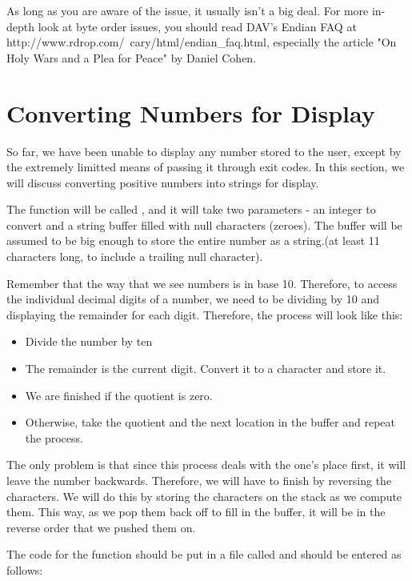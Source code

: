 As long as you are aware of the issue, it usually isn't a big deal.  For more
in-depth look at byte order issues, you should read DAV's Endian FAQ at http://www.rdrop.com/~cary/html/endian\_faq.html, especially the article "On Holy Wars and a Plea for Peace" by Daniel Cohen.

\section{Converting Numbers for Display}

So far, we have been unable to display any number stored to the 
user, except by the extremely limitted means of passing it through
exit codes.  In this section, we will discuss converting positive numbers
into strings for display.

The function will be called , and
it will take two parameters - an integer to convert and a string buffer 
filled with null characters (zeroes).  The buffer will be assumed to
be big enough to store the entire number as a string.(at least 11 characters
long, to include a trailing null character).

Remember that the way that we see numbers is in base 10.  Therefore, to access
the individual decimal digits of a number, we need to be dividing by 10
and displaying the remainder for each digit.  Therefore, the process will
look like this:

\begin{itemize}\item Divide the number by ten 
\item The remainder is the current digit.  Convert it to a character and store it. 
\item We are finished if the quotient is zero. 
\item Otherwise, take the quotient and the next location in the buffer and repeat the process. 
\end{itemize}

The only problem is that since this process deals with the one's place first,
it will leave the number backwards.  Therefore, we will have to finish by 
reversing the characters.  We will do this by storing the characters on
the stack as we compute them.  This way, as we pop them back off to fill
in the buffer, it will be in the reverse order that we pushed them on.

The code for the function should be put in a file called 
 and should be entered as follows:

